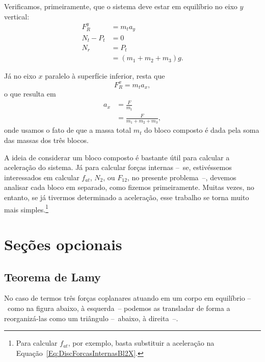 Verificamos, primeiramente, que o sistema deve estar em equilíbrio no eixo $y$ vertical: 
\begin{align}
    F_R^y &= m_t a_y \\
    N_t - P_t &= 0 \\
    N_r &= P_t \\
    &= (m_1 + m_2 + m_3) g.
\end{align}

Já no eixo $x$ paralelo à superfície inferior, resta que
\begin{equation}
    F_R^x = m_t a_x,
 \end{equation}
 o que resulta em
\begin{align}
    a_x &= \frac{F}{m_t} \\
    &= \frac{F}{m_1 + m_2 + m_3},
\end{align}
%
onde usamos o fato de que a massa total $m_t$ do bloco composto é dada pela soma das massas dos três blocos.

A ideia de considerar um bloco composto é bastante útil para calcular a aceleração do sistema. Já para calcular forças internas --~se, estivéssemos interessados em calcular $f_{at}$, $N_2$, ou $F_{12}$, no presente problema~--, devemos analisar cada bloco em separado, como fizemos primeiramente. Muitas vezes, no entanto, se já tivermos determinado a aceleração, esse trabalho se torna muito mais simples.\footnote{Para calcular $f_{at}$, por exemplo, basta substituir a aceleração na Equação~\eqref{Eq:DiscForcasInternasBl2X}.}

\section{Seções opcionais}

\subsection{Teorema de Lamy}

No caso de termos três forças coplanares atuando em um corpo em equilíbrio --~como na figura abaixo, à esquerda~-- podemos as transladar de forma a reorganizá-las como um triângulo --~abaixo, à direita~--.

